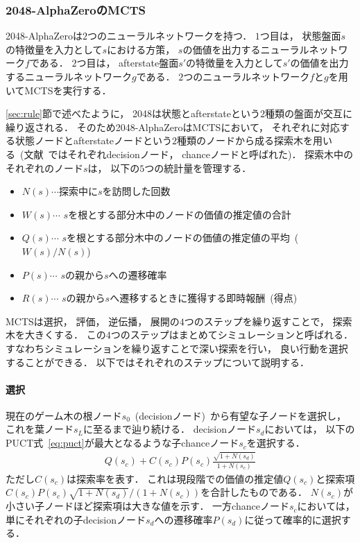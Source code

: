 \subsubsection{2048-AlphaZeroのMCTS}
2048-AlphaZeroは$2$つのニューラルネットワークを持つ．
$1$つ目は， 状態盤面$s$の特徴量を入力として$s$における方策， $s$の価値を出力するニューラルネットワーク$f$である．
$2$つ目は， afterstate盤面$s'$の特徴量を入力として$s'$の価値を出力するニューラルネットワーク$g$である．
$2$つのニューラルネットワーク$f$と$g$を用いてMCTSを実行する．

\ref{sec:rule}節で述べたように， 2048は状態とafterstateという$2$種類の盤面が交互に繰り返される．
そのため2048-AlphaZeroはMCTSにおいて， それぞれに対応する状態ノードとafterstateノードという$2$種類のノードから成る探索木を用いる~(文献~\cite{StochasticMuZero}ではそれぞれdecisionノード， chanceノードと呼ばれた)．
探索木中のそれぞれのノード$s$は， 以下の$5$つの統計量を管理する．
\begin{itemize}
  \item $N(s) \cdots$探索中に$s$を訪問した回数
  \item $W(s) \cdots$ $s$を根とする部分木中のノードの価値の推定値の合計
  \item $Q(s) \cdots$ $s$を根とする部分木中のノードの価値の推定値の平均~($W(s) / N(s)$)
  \item $P(s) \cdots$ $s$の親から$s$への遷移確率
  \item $R(s) \cdots$ $s$の親から$s$へ遷移するときに獲得する即時報酬~(得点)
\end{itemize}
MCTSは選択， 評価， 逆伝播， 展開の$4$つのステップを繰り返すことで， 探索木を大きくする．
この$4$つのステップはまとめてシミュレーションと呼ばれる．
すなわちシミュレーションを繰り返すことで深い探索を行い， 良い行動を選択することができる．
以下ではそれぞれのステップについて説明する．

\paragraph{選択}
現在のゲーム木の根ノード$s_0$~(decisionノード)~から有望な子ノードを選択し， これを葉ノード$s_L$に至るまで辿り続ける．
decisionノード$s_d$においては， 以下のPUCT式~\ref{eq:puct}が最大となるような子chanceノード$s_c$を選択する．
\begin{align}
  Q(s_c) + C(s_c)P(s_c)\frac{\sqrt{1+N(s_d)}}{1+N(s_c)}
  \label{eq:puct}
\end{align}
ただし$C(s_c)$は探索率を表す．
これは現段階での価値の推定値$Q(s_c)$と探索項$C(s_c)P(s_c)\sqrt{1+N(s_d)}/(1 + N(s_c))$を合計したものである．
$N(s_c)$が小さい子ノードほど探索項は大きな値を示す．
一方chanceノード$s_c$においては， 単にそれぞれの子decisionノード$s_d$への遷移確率$P(s_d)$に従って確率的に選択する．

